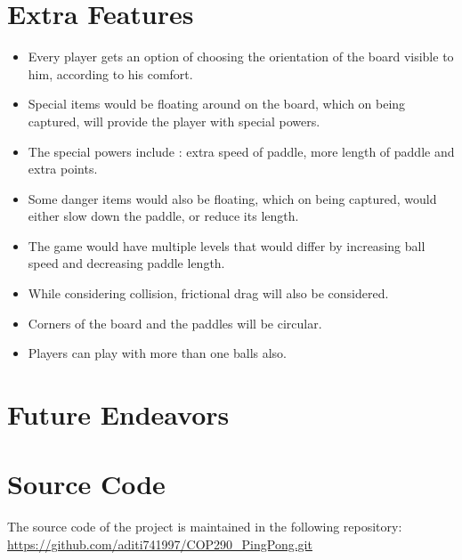 \documentclass{article}
\begin{document}
	\section{Extra Features}
	\begin{itemize}
	\item Every player gets an option of choosing the orientation of the board visible to him, according to his comfort.
	\item Special items would be floating around on the board, which on being captured, will provide the player with special powers.
	\item The special powers include : extra speed of paddle, more length of paddle and extra points.
	\item Some danger items would also be floating, which on being captured, would either slow down the paddle, or reduce its length.
	\item The game would have multiple levels that would differ by increasing ball speed and decreasing paddle length.
	\item While considering collision, frictional drag will also be considered.
	\item Corners of the board and the paddles will be circular.
	\item Players can play with more than one balls also. 
	\end{itemize}

	\section{Future Endeavors}

	\section{Source Code}
	The source code of the project is maintained in the following repository: \\
	\url{https://github.com/aditi741997/COP290_PingPong.git}
	
	\medskip
	
\end{document}
